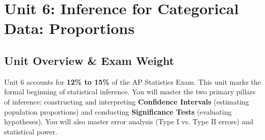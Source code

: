 \chapter{Unit 6: Inference for Categorical Data: Proportions}

\section{Unit Overview \& Exam Weight}
Unit 6 accounts for \textbf{12\% to 15\%} of the AP Statistics Exam. This unit marks the formal beginning of statistical inference. You will master the two primary pillars of inference: constructing and interpreting \textbf{Confidence Intervals} (estimating population proportions) and conducting \textbf{Significance Tests} (evaluating hypotheses). You will also master error analysis (Type I vs. Type II errors) and statistical power.

